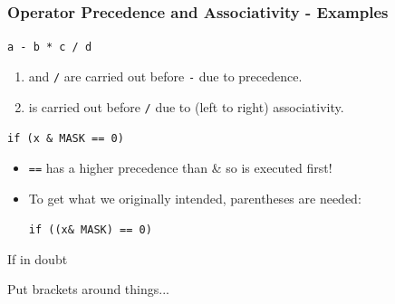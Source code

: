 \documentclass[table]{beamer}
\newif\ifschigh\schighfalse
\newcommand{\kw}[1]{\ifschigh\textcolor{red}{#1}\else\textcolor{keyword}{#1}\fi}
\begin{document}
\begin{frame}
\frametitle{Operator Precedence and Associativity - Examples}
\begin{exampleblock}{\tt a - b * c / d}
\begin{enumerate}
\item {\tt *} and {\tt /} are carried out before {\tt -} due to precedence.
\item {\tt *} is carried out before {\tt /} due to (left to right) associativity.
\end{enumerate}
\end{exampleblock}

\begin{alertblock}{\tt if (x \& MASK == 0)}
\begin{itemize}
\item {\tt ==} has a higher precedence than {\&} so is executed first!
\item To get what we originally intended, parentheses are needed:\\
\begin{center}
\tt \kw{if} ((x\& MASK) == 0)
\end{center}
\end{itemize}
\end{alertblock}

\begin{block}{If in doubt}
\begin{center}
Put brackets around things...
\end{center}
\end{block}
\end{frame}
\end{document}
